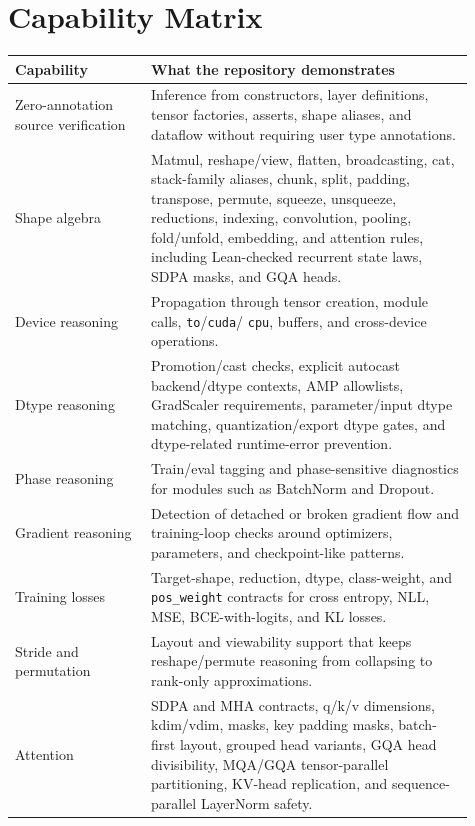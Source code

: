 \documentclass[11pt]{article}
\begin{document}
\clearpage

\appendix
\section{Capability Matrix}

\begin{longtable}{|p{0.27\linewidth}|p{0.64\linewidth}|}
\hline
\textbf{Capability} & \textbf{What the repository demonstrates} \\
\hline
Zero-annotation source verification &
Inference from constructors, layer definitions, tensor factories, asserts,
shape aliases, and dataflow without requiring user type annotations. \\
\hline
Shape algebra &
Matmul, reshape/view, flatten, broadcasting, cat, stack-family aliases, chunk, split,
padding, transpose, permute, squeeze, unsqueeze, reductions, indexing,
convolution, pooling, fold/unfold, embedding, and attention rules, including
Lean-checked recurrent state laws, SDPA masks, and GQA heads. \\
\hline
Device reasoning &
Propagation through tensor creation, module calls, \texttt{to}/\texttt{cuda}/
\texttt{cpu}, buffers, and cross-device operations. \\
\hline
Dtype reasoning &
Promotion/cast checks, explicit autocast backend/dtype contexts, AMP allowlists,
GradScaler requirements, parameter/input dtype matching, quantization/export
dtype gates, and dtype-related runtime-error prevention. \\
\hline
Phase reasoning &
Train/eval tagging and phase-sensitive diagnostics for modules such as
BatchNorm and Dropout. \\
\hline
Gradient reasoning &
Detection of detached or broken gradient flow and training-loop checks around
optimizers, parameters, and checkpoint-like patterns. \\
\hline
Training losses &
Target-shape, reduction, dtype, class-weight, and \texttt{pos\_weight}
contracts for cross entropy, NLL, MSE, BCE-with-logits, and KL losses. \\
\hline
Stride and permutation &
Layout and viewability support that keeps reshape/permute reasoning from
collapsing to rank-only approximations. \\
\hline
Attention &
SDPA and MHA contracts, q/k/v dimensions, kdim/vdim, masks, key padding masks,
batch-first layout, grouped head variants, GQA head divisibility,
MQA/GQA tensor-parallel partitioning, KV-head replication, and sequence-parallel
LayerNorm safety. \\

\end{longtable}
\end{document}
